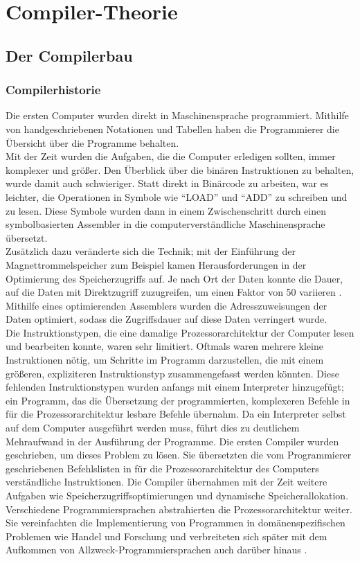 \part{Compiler-Theorie}
\chapter{Der Compilerbau}
\label{chap:theory:compilerHistory}

\section{Compilerhistorie}

Die ersten Computer wurden direkt in Maschinensprache programmiert.
Mithilfe von handgeschriebenen Notationen und Tabellen haben die Programmierer die Übersicht über
die Programme behalten.\\
Mit der Zeit wurden die Aufgaben, die die Computer erledigen sollten, immer komplexer und größer.
Den Überblick über die binären Instruktionen zu behalten, wurde damit auch schwieriger.
Statt direkt in Binärcode zu arbeiten, war es leichter, die Operationen in Symbole wie ``LOAD'' und ``ADD'' zu schreiben und zu lesen.
Diese Symbole wurden dann in einem Zwischenschritt durch einen symbolbasierten Assembler in die computerverständliche Maschinensprache übersetzt.\\
Zusätzlich dazu veränderte sich die Technik; 
mit der Einführung der Magnettrommelspeicher zum Beispiel kamen Herausforderungen in der Optimierung des Speicherzugriffs auf.
Je nach Ort der Daten konnte die Dauer, auf die Daten mit Direktzugriff zuzugreifen, um einen Faktor von 50 variieren \cite{calingaert:1979}.
Mithilfe eines optimierenden Assemblers wurden die Adresszuweisungen der Daten optimiert, sodass die Zugriffsdauer auf diese Daten verringert wurde.\\
Die Instruktionstypen, die eine damalige Prozessorarchitektur der Computer lesen und bearbeiten konnte, waren sehr limitiert.
Oftmals waren mehrere kleine Instruktionen nötig, um Schritte im Programm darzustellen, die mit einem größeren, expliziteren Instruktionstyp
zusammengefasst werden könnten.
Diese fehlenden Instruktionstypen wurden anfangs mit einem Interpreter hinzugefügt; ein Programm, das die Übersetzung der programmierten, komplexeren Befehle
in für die Prozessorarchitektur lesbare Befehle übernahm.
Da ein Interpreter selbst auf dem Computer ausgeführt werden muss, führt dies zu deutlichem Mehraufwand in der Ausführung der Programme.
Die ersten Compiler wurden geschrieben, um dieses Problem zu lösen.
Sie übersetzten die vom Programmierer geschriebenen Befehlslisten in für die Prozessorarchitektur des Computers verständliche Instruktionen.
Die Compiler übernahmen mit der Zeit weitere Aufgaben wie Speicherzugriffsoptimierungen und dynamische Speicherallokation.
Verschiedene Programmiersprachen abstrahierten die Prozessorarchitektur weiter.
Sie vereinfachten die Implementierung von Programmen in domänenspezifischen Problemen wie Handel und Forschung und verbreiteten sich später mit dem Aufkommen von Allzweck-Programmiersprachen auch darüber hinaus \cite{calingaert:1979}.

